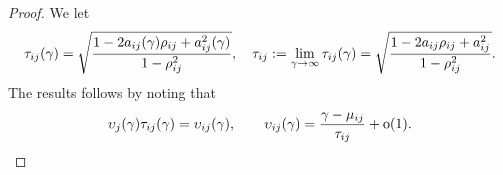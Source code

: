 \begin{subappendices}
\begin{proof}
We let
 \[
   \tau_{ij}(\gamma) =
   \sqrt{ \frac{1-2a_{ij}(\gamma)\rho_{ij} + a_{ij}^2(\gamma)}{1-\rho^2_{ij}}},\quad
  \tau_{ij} := \lim_{\gamma\to\infty}\tau_{ij}(\gamma)
    =\sqrt{ \frac{1-2a_{ij}\rho_{ij} + a_{ij}^2}{1-\rho^2_{ij}}}.
\]
The results follows by noting that
\[
 \upsilon_j(\gamma)\tau_{ij}(\gamma)= \upsilon_{ij}(\gamma),\qquad
 \upsilon_{ij}(\gamma)= \frac{\gamma-\mu_{ij}}{\tau_{ij}}+{\mathrm{o}}(1).
\]

\end{proof}
\end{subappendices}